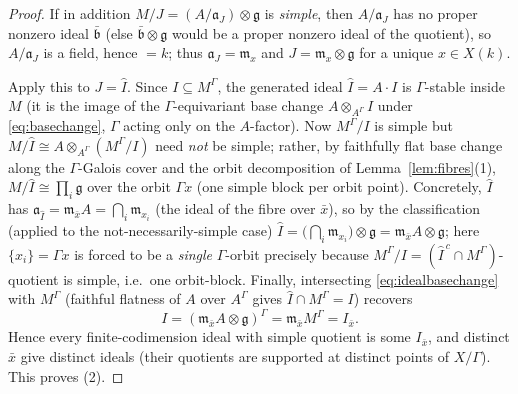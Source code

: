 \documentclass{amsart}
\theoremstyle{definition}
\newcommand{\g}{\mathfrak{g}}
\newcommand{\M}{M}
\begin{document}
\begin{proof}
If in addition $\M/J=(A/\mathfrak a_J)\otimes\g$ is \emph{simple}, then
$A/\mathfrak a_J$ has no proper nonzero ideal $\bar{\mathfrak b}$ (else
$\bar{\mathfrak b}\otimes\g$ would be a proper nonzero ideal of the
quotient), so $A/\mathfrak a_J$ is a field, hence $=k$; thus
$\mathfrak a_J=\mathfrak m_x$ and $J=\mathfrak m_x\otimes\g$ for a unique
$x\in X(k)$.

Apply this to $J=\widehat I$.  Since $I\subseteq\M^\Gamma$, the generated
ideal $\widehat I=A\cdot I$ is $\Gamma$-stable inside $\M$ (it is the image
of the $\Gamma$-equivariant base change $A\otimes_{A^\Gamma}I$ under
\eqref{eq:basechange}, $\Gamma$ acting only on the $A$-factor).  Now
$\M^\Gamma/I$ is simple but $\M/\widehat I\cong A\otimes_{A^\Gamma}
(\M^\Gamma/I)$ need \emph{not} be simple; rather, by faithfully flat base
change along the $\Gamma$-Galois cover and the orbit decomposition of
Lemma~\ref{lem:fibres}(1), $\M/\widehat I\cong\prod_{i}\g$ over the orbit
$\Gamma x$ (one simple block per orbit point).  Concretely, $\widehat I$ has
$\mathfrak a_{\widehat I}=\mathfrak m_{\bar x}A=\bigcap_i\mathfrak m_{x_i}$
(the ideal of the fibre over $\bar x$), so by the classification (applied to
the not-necessarily-simple case) $\widehat I=\bigl(\bigcap_i\mathfrak
m_{x_i}\bigr)\otimes\g=\mathfrak m_{\bar x}A\otimes\g$; here $\{x_i\}=
\Gamma x$ is forced to be a \emph{single} $\Gamma$-orbit precisely because
$\M^\Gamma/I=(\widehat I^{\,c}\cap\M^\Gamma)$-quotient is simple, i.e.\
one orbit-block.  Finally, intersecting \eqref{eq:idealbasechange} with
$\M^\Gamma$ (faithful flatness of $A$ over $A^\Gamma$ gives $\widehat I\cap
\M^\Gamma=I$) recovers
\[
I=(\mathfrak m_{\bar x}A\otimes\g)^\Gamma=\mathfrak m_{\bar x}\M^\Gamma=
I_{\bar x}.
\]
Hence every finite-codimension ideal with simple quotient is some
$I_{\bar x}$, and distinct $\bar x$ give distinct ideals (their quotients
are supported at distinct points of $X/\Gamma$).  This proves (2).
\end{proof}
\end{document}
